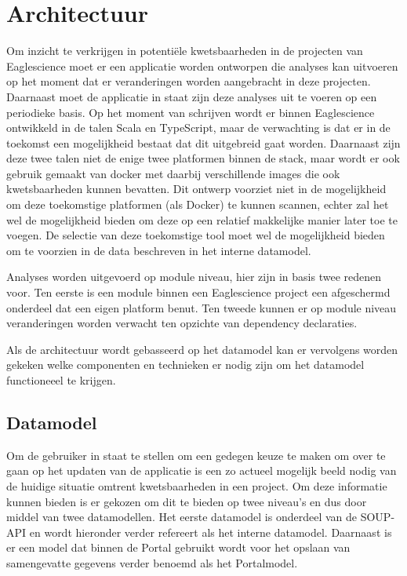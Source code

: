 \chapter{Architectuur}\label{ch:Architectuur}

Om inzicht te verkrijgen in potentiële kwetsbaarheden in de projecten van Eaglescience moet er een applicatie worden ontworpen die analyses kan uitvoeren op het moment dat er veranderingen worden aangebracht in deze projecten. Daarnaast moet de applicatie in staat zijn deze analyses uit te voeren op een periodieke basis.
Op het moment van schrijven wordt er binnen Eaglescience ontwikkeld in de talen Scala en TypeScript, maar de verwachting is dat er in de toekomst een mogelijkheid bestaat dat dit uitgebreid gaat worden. Daarnaast zijn deze twee talen niet de enige twee platformen binnen de stack, maar wordt er ook gebruik gemaakt van docker met daarbij verschillende images die ook kwetsbaarheden kunnen bevatten. Dit ontwerp voorziet niet in de mogelijkheid om deze toekomstige platformen (als Docker) te kunnen scannen, echter zal het wel de mogelijkheid bieden om deze op een relatief makkelijke manier later toe te voegen. De selectie van deze toekomstige tool moet wel de mogelijkheid bieden om te voorzien in de data beschreven in het interne datamodel.

Analyses worden uitgevoerd op module niveau, hier zijn in basis twee redenen voor. Ten eerste is een module binnen een Eaglescience project een afgeschermd onderdeel dat een eigen platform benut. Ten tweede kunnen er op module niveau veranderingen worden verwacht ten opzichte van dependency declaraties.

Als de architectuur wordt gebasseerd op het datamodel kan er vervolgens worden gekeken welke componenten en technieken er nodig zijn om het datamodel functioneeel te krijgen.

\section{Datamodel}\label{sec:datamodel}
Om de gebruiker in staat te stellen om een gedegen keuze te maken om over te gaan op het updaten van de applicatie is een zo actueel mogelijk beeld nodig van de huidige situatie omtrent kwetsbaarheden in een project. Om deze informatie kunnen bieden is er gekozen om dit te bieden op twee niveau's en dus door middel van twee datamodellen.
Het eerste datamodel is onderdeel van de SOUP-API en wordt hieronder verder refereert als het interne datamodel. Daarnaast is er een model dat binnen de Portal gebruikt wordt voor het opslaan van samengevatte gegevens verder benoemd als het Portalmodel.


